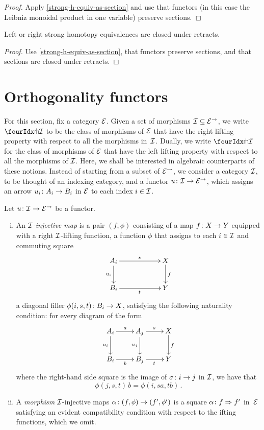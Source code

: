 \documentclass[reqno,10pt,a4paper,oneside]{amsart}
\begin{document}
\begin{proof}
Apply \cref{strong-h-equiv-as-section} and use that functors (in this case the Leibniz monoidal product in one variable) preserve sections.
\end{proof}

\begin{proposition}
\label{strong-h-equiv-closed-under-retract}
Left or right strong homotopy equivalences are closed under retracts.
\end{proposition}

\begin{proof}
Use \cref{strong-h-equiv-as-section},  that functors preserve sections, and that  sections are closed under retracts.
\end{proof}



\section{Orthogonality functors}
\label{sec:ortf}

For this section, fix a category $\catE$. Given a set of morphisms $\cal{I} \subseteq \catE^\to$, we 
write $\liftr{\cal{I}}$ to be the class of morphisms of $\catE$ that have 
the right lifting property with respect to all the morphisms in~$\cal{I}$. Dually, we write $\liftl{\cal{I}}$ for the class of morphisms of $\catE$ that have the left lifting property with respect to all the morphisms of $\cal{I}$. 
Here, we shall be interested in algebraic counterparts of these notions. Instead of starting from a subset of $\catE^\to$, we consider a category $\cal{I}$, to be thought of an indexing category, and a functor $u \co \cal{I} \to \catE^\to$, which assigns an arrow $u_i \co A_i \to B_i$ in $\catE$ to each index $i \in \cal{I}$.


 \begin{definition} Let $u \co \cal{I} \to \catE^\to$ be a functor. 
 \begin{enumerate}[(i)] 
 \item  An \emph{$\cal{I}$-injective map}
 is a pair $(f, \phi)$ consisting of a map $f \co X \to Y$ equipped with a right  $\cal{I}$-lifting function, \ie 
 a function  $\phi$ that assigns to each $i \in \cal{I}$ and commuting square
\[
\xymatrix@C=2cm{
A_i \ar[r]^{s}   \ar[d]_{u_i} & X \ar[d]^f \\
B_i \ar[r]_{t} & Y}
\]
a diagonal filler $\phi(i,s, t) \co B_i \to X$, satisfying the following naturality 
condition: for every diagram of the form
\[
\xymatrix{
A_i \ar[r]^a \ar[d]_{u_i} & A_j \ar[r]^{s}  \ar[d]_{u_j} & X \ar[d]^f   \\
B_i \ar[r]_{b}  & B_j  \ar[r]_{t}  & Y }
\]
where the right-hand side square is the image of $\sigma \co i \to j$ in $\cal{I}$, 
we have that 
\[
\phi(j, s, t) \, b = \phi(i, s  a, t  b) \, .
\]
\item A \emph{morphism} $\cal{I}$-injective maps $\alpha \co (f, \phi) \to (f', \phi')$ is a 
square $\alpha \co f \Rightarrow f'$ in~$\catE$ satisfying an evident compatibility condition 
with respect to the ifting functions, which we omit. 
\end{enumerate}
\end{definition}
\end{document}
